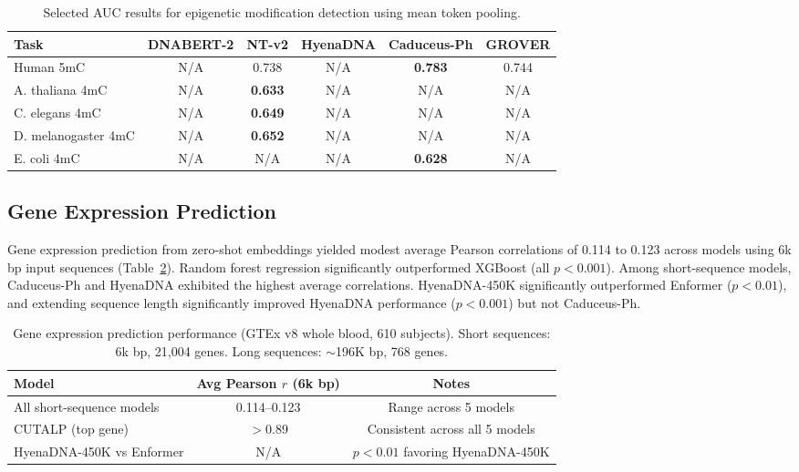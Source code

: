 \documentclass[11pt]{article}
\begin{document}
\begin{table}[htbp]
\centering
\caption{Selected AUC results for epigenetic modification detection using mean token pooling.}
\label{tab:epigenetic}
\begin{tabular}{lccccc}
\toprule
Task & DNABERT-2 & NT-v2 & HyenaDNA & Caduceus-Ph & GROVER \\
\midrule
Human 5mC & N/A & 0.738 & N/A & \textbf{0.783} & 0.744 \\
A. thaliana 4mC & N/A & \textbf{0.633} & N/A & N/A & N/A \\
C. elegans 4mC & N/A & \textbf{0.649} & N/A & N/A & N/A \\
D. melanogaster 4mC & N/A & \textbf{0.652} & N/A & N/A & N/A \\
E. coli 4mC & N/A & N/A & N/A & \textbf{0.628} & N/A \\
\bottomrule
\end{tabular}
\end{table}

\subsection{Gene Expression Prediction}

Gene expression prediction from zero-shot embeddings yielded modest average Pearson correlations of 0.114 to 0.123 across models using 6k bp input sequences (Table~\ref{tab:gene_expr}). Random forest regression significantly outperformed XGBoost (all $p < 0.001$). Among short-sequence models, Caduceus-Ph and HyenaDNA exhibited the highest average correlations. HyenaDNA-450K significantly outperformed Enformer ($p < 0.01$), and extending sequence length significantly improved HyenaDNA performance ($p < 0.001$) but not Caduceus-Ph.

\begin{table}[htbp]
\centering
\caption{Gene expression prediction performance (GTEx v8 whole blood, 610 subjects). Short sequences: 6k bp, 21,004 genes. Long sequences: $\sim$196K bp, 768 genes.}
\label{tab:gene_expr}
\begin{tabular}{lcc}
\toprule
Model & Avg Pearson $r$ (6k bp) & Notes \\
\midrule
All short-sequence models & 0.114--0.123 & Range across 5 models \\
CUTALP (top gene) & $>$0.89 & Consistent across all 5 models \\
HyenaDNA-450K vs Enformer & N/A & $p < 0.01$ favoring HyenaDNA-450K \\
\bottomrule
\end{tabular}
\end{table}
\end{document}
